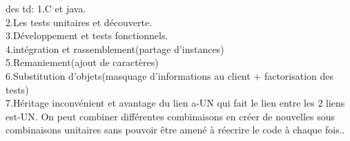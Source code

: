 \documentclass{article}
\begin{document}
\FIN des td:\newline
1.C et java.\\
2.Les tests unitaires et découverte.\\
3.Développement et tests fonctionnels.\\
4.intégration et rassemblement(partage d'instances)\\
5.Remaniement(ajout de caractères)\\
6.Substitution d'objets(masquage d'informations au client + factorisation des tests)\\
7.Héritage inconvénient et avantage du lien a-UN qui fait le lien entre les 2 liens est-UN. On peut combiner différentes combinaisons en créer de nouvelles sous combinaisons unitaires sans pouvoir être amené à réecrire le code à chaque fois..\\
\end{document}
